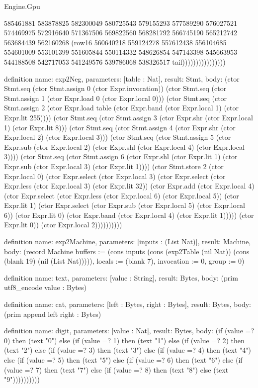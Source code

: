 \begin{lexlean}{Engine.Gpu}
\begin{semanticmodule}
{585461881 583878825 582300049 580725543 579155293 577589290 576027521 574469975 572916640 571367506 569822560 568281792 566745190 565212742 563684439 562160268 (row16 560640218 559124278 557612438 556104685 554601009 553101399 551605844 550114332 548626854 547143398 545663953 544188508 542717053 541249576 539786068 538326517 tail))))))))))))))))
}

definition{
  name: exp2Neg,
  parameters: [table : Nat],
  result: Stmt,
  body: (ctor Stmt.seq (ctor Stmt.assign 0 (ctor Expr.invocation)) (ctor Stmt.seq (ctor Stmt.assign 1 (ctor Expr.load 0 (ctor Expr.local 0))) (ctor Stmt.seq (ctor Stmt.assign 2 (ctor Expr.load table (ctor Expr.band (ctor Expr.local 1) (ctor Expr.lit 255)))) (ctor Stmt.seq (ctor Stmt.assign 3 (ctor Expr.shr (ctor Expr.local 1) (ctor Expr.lit 8))) (ctor Stmt.seq (ctor Stmt.assign 4 (ctor Expr.shr (ctor Expr.local 2) (ctor Expr.local 3))) (ctor Stmt.seq (ctor Stmt.assign 5 (ctor Expr.sub (ctor Expr.local 2) (ctor Expr.shl (ctor Expr.local 4) (ctor Expr.local 3)))) (ctor Stmt.seq (ctor Stmt.assign 6 (ctor Expr.shl (ctor Expr.lit 1) (ctor Expr.sub (ctor Expr.local 3) (ctor Expr.lit 1)))) (ctor Stmt.store 2 (ctor Expr.local 0) (ctor Expr.select (ctor Expr.local 3) (ctor Expr.select (ctor Expr.less (ctor Expr.local 3) (ctor Expr.lit 32)) (ctor Expr.add (ctor Expr.local 4) (ctor Expr.select (ctor Expr.less (ctor Expr.local 6) (ctor Expr.local 5)) (ctor Expr.lit 1) (ctor Expr.select (ctor Expr.sub (ctor Expr.local 5) (ctor Expr.local 6)) (ctor Expr.lit 0) (ctor Expr.band (ctor Expr.local 4) (ctor Expr.lit 1))))) (ctor Expr.lit 0)) (ctor Expr.local 2))))))))))
}

definition{
  name: exp2Machine,
  parameters: [inputs : (List Nat)],
  result: Machine,
  body: (record Machine {buffers := (cons inputs (cons (exp2Table (nil Nat)) (cons (blank 19) (nil (List Nat))))), locals := (blank 7), invocation := 0, group := 0})
}

definition{
  name: text,
  parameters: [value : String],
  result: Bytes,
  body: (prim utf8_encode value : Bytes)
}

definition{
  name: cat,
  parameters: [left : Bytes, right : Bytes],
  result: Bytes,
  body: (prim append left right : Bytes)
}

definition{
  name: digit,
  parameters: [value : Nat],
  result: Bytes,
  body: (if (value =? 0) then (text "0") else (if (value =? 1) then (text "1") else (if (value =? 2) then (text "2") else (if (value =? 3) then (text "3") else (if (value =? 4) then (text "4") else (if (value =? 5) then (text "5") else (if (value =? 6) then (text "6") else (if (value =? 7) then (text "7") else (if (value =? 8) then (text "8") else (text "9"))))))))))
}


\end{semanticmodule}
\end{lexlean}
